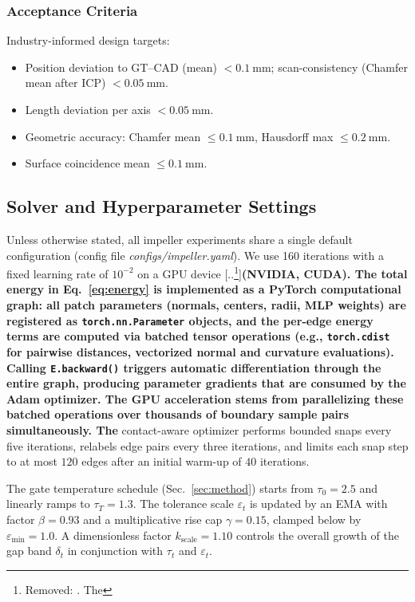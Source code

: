 \documentclass{ieeeaccess}
\providecommand{\DIFaddtex}[1]{{\color{blue}\bfseries #1}} %
\providecommand{\DIFdeltex}[1]{{\color{red}[..\footnote{\color{black}Removed: #1}]}} %
\providecommand{\DIFaddbegin}{} %
\providecommand{\DIFaddend}{} %
\providecommand{\DIFdelbegin}{} %
\providecommand{\DIFdelend}{} %
\providecommand{\DIFadd}[1]{\texorpdfstring{\DIFaddtex{#1}}{#1}} %
\providecommand{\DIFdel}[1]{\texorpdfstring{\DIFdeltex{#1}}{}} %
\begin{document}
\subsubsection{Acceptance Criteria}\label{sec:accept}
Industry-informed design targets:
\begin{itemize}
  \item Position deviation to GT--CAD (mean) $<\SI{0.1}{\milli\meter}$;
        scan-consistency (Chamfer mean after ICP) $<\SI{0.05}{\milli\meter}$.
  \item Length deviation per axis $<\SI{0.05}{\milli\meter}$.
  \item Geometric accuracy: Chamfer mean $\le\SI{0.1}{\milli\meter}$, Hausdorff max $\le\SI{0.2}{\milli\meter}$.
  \item Surface coincidence mean $\le\SI{0.1}{\milli\meter}$.
\end{itemize}


\subsection{Solver and Hyperparameter Settings}
\label{sec:hyperparams}

Unless otherwise stated, all impeller experiments share a single default
configuration (config file \emph{configs/impeller.yaml}).
We use 160 iterations with a fixed learning rate of $10^{-2}$ on a GPU
device \DIFdelbegin \DIFdel{. The }\DIFdelend \DIFaddbegin \DIFadd{(NVIDIA, CUDA).
The total energy in Eq.~\eqref{eq:energy} is implemented as a PyTorch
computational graph: all patch parameters (normals, centers, radii,
MLP weights) are registered as \texttt{torch.nn.Parameter} objects, and
the per-edge energy terms are computed via batched tensor operations
(e.g., \texttt{torch.cdist} for pairwise distances, vectorized normal
and curvature evaluations).
Calling \texttt{E.backward()} triggers automatic differentiation through
the entire graph, producing parameter gradients that are consumed by
the Adam optimizer.
The GPU acceleration stems from parallelizing these batched operations
over thousands of boundary sample pairs simultaneously.
The }\DIFaddend contact-aware optimizer performs bounded snaps every
five iterations, relabels edge pairs every three iterations, and limits each
snap step to at most $120$ edges after an initial warm-up of
$40$ iterations.

The gate temperature schedule (Sec.~\ref{sec:method}) starts from
$\tau_0 = 2.5$ and linearly ramps to
$\tau_T = 1.3$. The tolerance scale
$\varepsilon_t$ is updated by an EMA with factor
$\beta = 0.93$ and a multiplicative rise cap
$\gamma = 0.15$, clamped below by
$\varepsilon_{\min} = 1.0$. A dimensionless factor
$k_{\mathrm{scale}} = 1.10$ controls the overall growth of the gap band
$\delta_t$ in conjunction with $\tau_t$ and $\varepsilon_t$.
\end{document}
